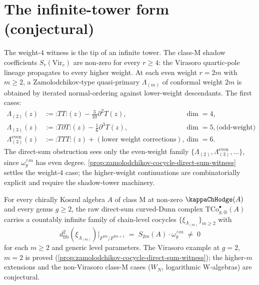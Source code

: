 \section{The infinite-tower form (conjectural)}
\label{sec:infinite-tower}

The weight-\(4\) witness is the tip of an infinite tower. The
class-\(\mathrm{M}\) shadow coefficients
\(S_{r}(\mathrm{Vir}_{c})\) are non-zero for every \(r \ge 4\):
the Virasoro quartic-pole lineage propagates to every higher
weight. At each even weight \(r = 2m\) with \(m \ge 2\), a
Zamolodchikov-type quasi-primary \(\Lambda_{(m)}\) of conformal
weight \(2m\) is obtained by iterated normal-ordering against
lower-weight descendants. The first cases:
\begin{align*}
 \Lambda_{(2)}(z) &:= {\mathord:} T T {\mathord:}(z) - \frac{3}{10}\partial^{2} T(z),
 &\dim = 4,\\
 \Lambda_{(3)}(z) &:= {\mathord:} T \partial T {\mathord:}(z) - \frac{1}{6}\partial^{3} T(z),
 &\dim = 5,
 \text{(odd-weight)}\\
 \Lambda_{(3)}^{\mathrm{even}}(z) &:= {\mathord:} T T T {\mathord:}(z) + (\text{lower weight corrections}),
 &\dim = 6.
\end{align*}
The direct-sum obstruction sees only the even-weight family
\(\{\Lambda_{(2)}, \Lambda_{(3)}^{\mathrm{even}}, \ldots\}\),
since \(\omega_{g}^{\wedge m}\) has even degree.
\autoref{prop:zamolodchikov-cocycle-direct-sum-witness} settles
the weight-\(4\) case; the higher-weight continuations are
combinatorially explicit and require the shadow-tower machinery.

\begin{conjecture}
\label{conj:class-m-direct-sum-obstruction}
\ClaimStatusConjectured
For every chirally Koszul algebra \(A\) of class
\(\mathrm{M}\) at non-zero \(\kappaChHodge(A)\) and every genus
\(g \ge 2\), the raw direct-sum curved-Dunn complex
\(\mathrm{TCo}^{\bullet}_{g,\oplus}(A)\) carries a countably
infinite family of chain-level cocycles
\(\{\xi_{\Lambda_{(m)}}\}_{m \ge 2}\) with
\[
 d^{2}_{\mathrm{fib}}(\xi_{\Lambda_{(m)}})
 \Big|_{F^{2m}/F^{2m+1}}
 \;=\;
 S_{2m}(A) \cdot \omega_{g}^{\wedge m}
 \;\ne\; 0
\]
for each \(m \ge 2\) and generic level parameters.
The Virasoro example at \(g = 2\), \(m = 2\) is proved
(\autoref{prop:zamolodchikov-cocycle-direct-sum-witness}); the
higher-\(m\) extensions and the non-Virasoro class-\(\mathrm{M}\)
cases (\(W_{N}\), logarithmic W-algebras) are conjectural.
\end{conjecture}

